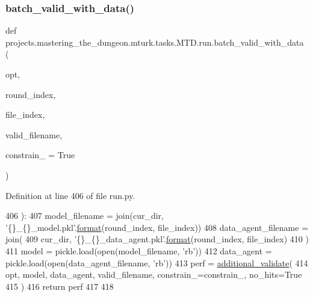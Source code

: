 \subsubsection{\texorpdfstring{batch\+\_\+valid\+\_\+with\+\_\+data()}{batch\_valid\_with\_data()}}
{\footnotesize\ttfamily def projects.\+mastering\+\_\+the\+\_\+dungeon.\+mturk.\+tasks.\+M\+T\+D.\+run.\+batch\+\_\+valid\+\_\+with\+\_\+data (\begin{DoxyParamCaption}\item[{}]{opt,  }\item[{}]{round\+\_\+index,  }\item[{}]{file\+\_\+index,  }\item[{}]{valid\+\_\+filename,  }\item[{}]{constrain\+\_\+ = {\ttfamily True} }\end{DoxyParamCaption})}



Definition at line 406 of file run.\+py.


\begin{DoxyCode}
406 ):
407     model\_filename = join(cur\_dir, \textcolor{stringliteral}{'\{\}\_\{\}\_model.pkl'}.\hyperlink{namespaceparlai_1_1chat__service_1_1services_1_1messenger_1_1shared__utils_a32e2e2022b824fbaf80c747160b52a76}{format}(round\_index, file\_index))
408     data\_agent\_filename = join(
409         cur\_dir, \textcolor{stringliteral}{'\{\}\_\{\}\_data\_agent.pkl'}.\hyperlink{namespaceparlai_1_1chat__service_1_1services_1_1messenger_1_1shared__utils_a32e2e2022b824fbaf80c747160b52a76}{format}(round\_index, file\_index)
410     )
411     model = pickle.load(open(model\_filename, \textcolor{stringliteral}{'rb'}))
412     data\_agent = pickle.load(open(data\_agent\_filename, \textcolor{stringliteral}{'rb'}))
413     perf = \hyperlink{namespacegraph__world2_1_1train_aaff96a1b7f0cafac9dab96cbc02ae4d0}{additional\_validate}(
414         opt, model, data\_agent, valid\_filename, constrain\_=constrain\_, no\_hits=\textcolor{keyword}{True}
415     )
416     \textcolor{keywordflow}{return} perf
417 
418 
\end{DoxyCode}
\mbox{\label{namespaceprojects_1_1mastering__the__dungeon_1_1mturk_1_1tasks_1_1MTD_1_1run_ae84843b54586b020d47c60d95340e1d7}} 
